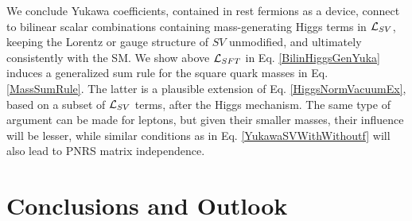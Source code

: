 \documentclass[12pt]{article}
\renewcommand\[{\begin{dmath}}
\renewcommand\]{\end{dmath}}
\begin{document}




  We conclude   Yukawa  coefficients, contained in rest  fermions     as    a device,   connect  to    bilinear scalar combinations containing mass-generating Higgs terms in ${\cal L}_{SV }$,  keeping  the Lorentz or gauge structure of $SV$ unmodified, and ultimately consistently with the SM. We show above ${\cal L}_{SFT }$ in Eq.
  \ref{BilinHiggsGenYuka} induces a generalized    sum rule for the square quark masses in Eq. \ref{MassSumRule}.  The latter is a plausible extension of Eq.  \ref{HiggsNormVacuumEx}, based on a subset of  ${\cal L}_{SV }$ terms, after the Higgs mechanism.
   The same type of argument can be made for
  leptons, but given their smaller   masses, their influence will be lesser, while similar conditions as in Eq. \ref{YukawaSVWithWithoutf} will also lead to
  PNRS     matrix\cite{PNRS}  independence.


\section{Conclusions and Outlook}


\end{document}
